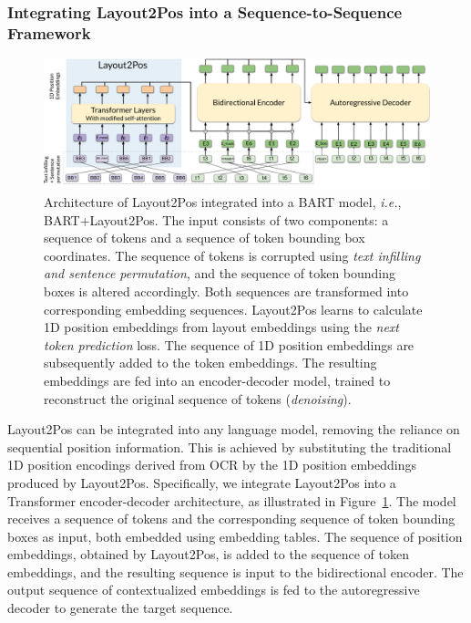 \subsubsection{Integrating Layout2Pos into a Sequence-to-Sequence Framework}

\begin{figure}
  \centering
  \includegraphics[width=\textwidth]{images/chapter4/Layout2Pos+BART.pdf}
  \caption{Architecture of Layout2Pos integrated into a BART model, \textit{i.e.}, BART+Layout2Pos. The input consists of two components: a sequence of tokens and a sequence of token bounding box coordinates. The sequence of tokens is corrupted using \textit{text infilling and sentence permutation}, and the sequence of token bounding boxes is altered accordingly. Both  sequences are transformed into corresponding embedding sequences. Layout2Pos learns to calculate 1D position embeddings from layout embeddings using the \textit{next token prediction} loss. The sequence of 1D position embeddings are subsequently added to the token embeddings. The resulting embeddings are fed into an encoder-decoder model, trained to reconstruct the original sequence of tokens (\textit{denoising}).}
  \label{fig:layout2pos-ed}
\end{figure}

Layout2Pos can be integrated into any language model, removing the reliance on sequential position information. This is achieved by substituting the traditional 1D position encodings derived from \ac{OCR} by the 1D position embeddings produced by Layout2Pos. Specifically, we integrate Layout2Pos into a Transformer encoder-decoder architecture, as illustrated in Figure~\ref{fig:layout2pos-ed}. The model receives a sequence of tokens and the corresponding sequence of token bounding boxes as input, both embedded using embedding tables. The sequence of position embeddings, obtained by Layout2Pos, is added to the sequence of token embeddings, and the resulting sequence is input to the bidirectional encoder. The output sequence of contextualized embeddings is fed to the autoregressive decoder to generate the target sequence.

